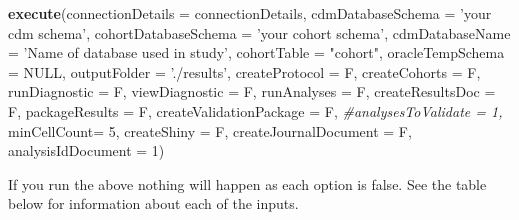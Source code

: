 \documentclass[
]{article}
\newenvironment{Shaded}{\begin{snugshade}}{\end{snugshade}}
\newcommand{\CommentTok}[1]{\textcolor[rgb]{0.56,0.35,0.01}{\textit{#1}}}
\newcommand{\DataTypeTok}[1]{\textcolor[rgb]{0.13,0.29,0.53}{#1}}
\newcommand{\DecValTok}[1]{\textcolor[rgb]{0.00,0.00,0.81}{#1}}
\newcommand{\KeywordTok}[1]{\textcolor[rgb]{0.13,0.29,0.53}{\textbf{#1}}}
\newcommand{\NormalTok}[1]{#1}
\newcommand{\OtherTok}[1]{\textcolor[rgb]{0.56,0.35,0.01}{#1}}
\newcommand{\StringTok}[1]{\textcolor[rgb]{0.31,0.60,0.02}{#1}}
\begin{document}
\begin{Shaded}
\begin{Highlighting}[]
\KeywordTok{execute}\NormalTok{(}\DataTypeTok{connectionDetails =}\NormalTok{ connectionDetails,}
        \DataTypeTok{cdmDatabaseSchema =} \StringTok{'your cdm schema'}\NormalTok{,}
        \DataTypeTok{cohortDatabaseSchema =} \StringTok{'your cohort schema'}\NormalTok{,}
        \DataTypeTok{cdmDatabaseName =} \StringTok{'Name of database used in study'}\NormalTok{,}
        \DataTypeTok{cohortTable =} \StringTok{"cohort"}\NormalTok{,}
        \DataTypeTok{oracleTempSchema =} \OtherTok{NULL}\NormalTok{,}
        \DataTypeTok{outputFolder =} \StringTok{'./results'}\NormalTok{, }
        \DataTypeTok{createProtocol =}\NormalTok{ F,}
        \DataTypeTok{createCohorts =}\NormalTok{ F,}
        \DataTypeTok{runDiagnostic =}\NormalTok{ F, }
        \DataTypeTok{viewDiagnostic =}\NormalTok{ F, }
        \DataTypeTok{runAnalyses =}\NormalTok{ F,}
        \DataTypeTok{createResultsDoc =}\NormalTok{ F,}
        \DataTypeTok{packageResults =}\NormalTok{ F,}
        \DataTypeTok{createValidationPackage =}\NormalTok{ F,  }
        \CommentTok{#analysesToValidate = 1,}
        \DataTypeTok{minCellCount=} \DecValTok{5}\NormalTok{,}
        \DataTypeTok{createShiny =}\NormalTok{ F,}
        \DataTypeTok{createJournalDocument =}\NormalTok{ F,}
        \DataTypeTok{analysisIdDocument =} \DecValTok{1}\NormalTok{)}
\end{Highlighting}
\end{Shaded}

If you run the above nothing will happen as each option is false. See
the table below for information about each of the inputs.
\end{document}
